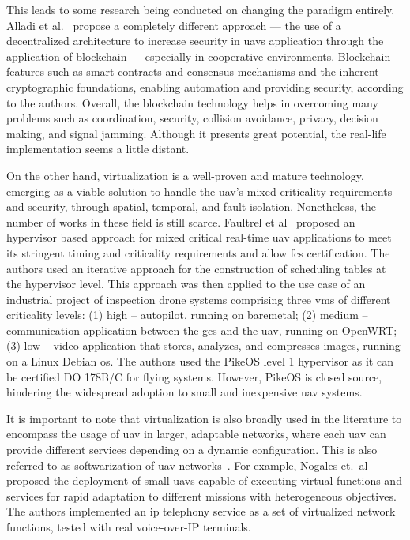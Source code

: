 This leads to some research being conducted on changing the paradigm entirely.
Alladi et al.~\cite{alladi2022UAVBlockain} propose a completely different
approach --- the use of a decentralized architecture to increase security in
\glspl{uav} application through the application of blockchain --- especially in
cooperative environments. Blockchain features such as smart contracts and
consensus mechanisms and the inherent cryptographic foundations, enabling
automation and providing security, according to the authors. Overall, the
blockchain technology helps in overcoming many problems such as coordination,
security, collision avoidance, privacy, decision making, and signal
jamming. Although it presents great potential, the real-life implementation
seems a little distant.

On the other hand, virtualization is a well-proven and mature technology,
emerging as a viable solution to handle the \gls{uav}'s
mixed-criticality requirements and security, through spatial, temporal, and
fault isolation. Nonetheless, the number of works in these field is still scarce.
Faultrel et al~\cite{fautrel2019hypervisor} proposed an hypervisor based
approach for mixed critical real-time \gls{uav} applications to meet its
stringent timing and criticality requirements and allow \gls{fcs}
certification. The authors used an iterative approach for the construction of
scheduling tables at the hypervisor level. This approach was then applied to the
use case of an industrial project of inspection drone systems comprising three
\glspl{vm} of different criticality levels: (1) high -- autopilot, running on baremetal; (2) medium --
communication application between the \gls{gcs} and the \gls{uav}, running on OpenWRT; (3) low --
video application that stores, analyzes, and compresses images, running on a
Linux Debian \gls{os}. The authors used the PikeOS level 1 hypervisor as it can
be certified DO 178B/C for flying systems. However, PikeOS is closed source,
hindering the widespread adoption to small and inexpensive \gls{uav} systems.

It is important to note that virtualization is also broadly used in the literature to encompass the usage of
\gls{uav} in larger, adaptable networks, where each \gls{uav} can provide
different services depending on a dynamic configuration. This is also referred
to as softwarization of \gls{uav} networks~\cite{oubbati2020softwarization}. For
example, Nogales et.~al~\cite{nogales2018adaptable} proposed the deployment of
small \glspl{uav} capable of executing virtual functions and services for rapid
adaptation to different missions with heterogeneous objectives. The authors
implemented an \gls{ip} telephony service as a set of virtualized network
functions, tested with real voice-over-IP terminals.

